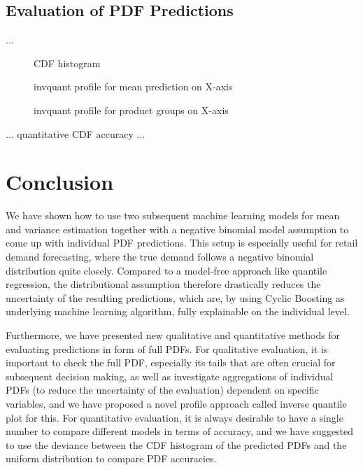 \documentclass[BCOR=1mm, DIV=calc,10pt,
twoside=true,
twocolumn,
headings=normal]{scrartcl}
\begin{document}
\subsection{Evaluation of PDF Predictions}

...

\begin{figure}
\begin{center}
\caption{\label{fig:cdf_demand} CDF histogram}
\end{center}
\end{figure}

\begin{figure}
\begin{center}
\caption{\label{fig:invquant_mean} invquant profile for mean prediction on X-axis}
\end{center}
\end{figure}

\begin{figure}
\begin{center}
\caption{\label{fig:invquant_pg} invquant profile for product groups on X-axis}
\end{center}
\end{figure}

... quantitative CDF accuracy ...


\section{Conclusion}

We have shown how to use two subsequent machine learning models for mean and variance estimation together with a negative binomial model assumption to come up with individual PDF predictions. This setup is especially useful for retail demand forecasting, where the true demand follows a negative binomial distribution quite closely. Compared to a model-free approach like quantile regression, the distributional assumption therefore drastically reduces the uncertainty of the resulting predictions, which are, by using Cyclic Boosting as underlying machine learning algorithm, fully explainable on the individual level. 

Furthermore, we have presented new qualitative and quantitative methods for evaluating predictions in form of full PDFs. For qualitative evaluation, it is important to check the full PDF, especially its tails that are often crucial for subsequent decision making, as well as investigate aggregations of individual PDFs (to reduce the uncertainty of the evaluation) dependent on specific variables, and we have proposed a novel profile approach called inverse quantile plot for this. For quantitative evaluation, it is always desirable to have a single number to compare different models in terms of accuracy, and we have suggested to use the deviance between the CDF histogram of the predicted PDFs and the uniform distribution to compare PDF accuracies.
\end{document}
